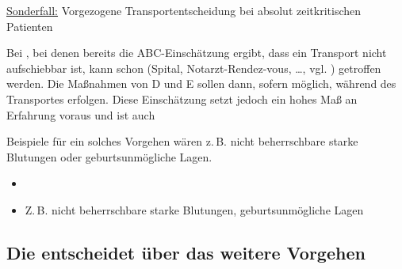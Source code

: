 
\clearpage%



\TextSlide
{\underline{Sonderfall:} Vorgezogene Transportentscheidung bei absolut zeitkritischen Patienten}
{%
\label{topic:sonderfall-absolut-zeitkritische-patienten}
Bei , bei denen bereits
die ABC-Einschätzung ergibt, dass ein Transport nicht
aufschiebbar ist, kann schon  (Spital,
Notarzt-Rendez-vous, \ldots, vgl.
) getroffen werden.
Die Maßnahmen von D und E sollen dann, sofern möglich,
während des Transportes erfolgen.
Diese Einschätzung setzt jedoch ein hohes Maß an Erfahrung
voraus und ist auch


Beispiele für ein solches Vorgehen wären z.\,B. nicht
beherrschbare starke Blutungen oder geburtsunmögliche Lagen.
}
{
\begin{itemize}
  \item {}
  \item Z.\,B. nicht beherrschbare starke 
  Blutungen, geburtsunmögliche Lagen
\end{itemize}
}
{}
{}
{}





\subsection{Die  entscheidet über das weitere Vorgehen}

